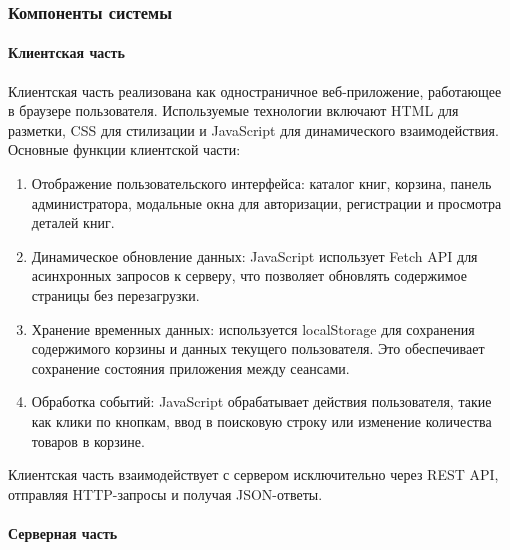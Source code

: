 \subsubsection{Компоненты системы}

\paragraph{Клиентская часть}

Клиентская часть реализована как одностраничное веб-приложение, работающее в браузере пользователя. Используемые технологии включают HTML для разметки, CSS для стилизации и JavaScript для динамического взаимодействия. Основные функции клиентской части:
	\begin{enumerate}
		\item Отображение пользовательского интерфейса: каталог книг, корзина, панель администратора, модальные окна для авторизации, регистрации и просмотра деталей книг.
		\item Динамическое обновление данных: JavaScript использует Fetch API для асинхронных запросов к серверу, что позволяет обновлять содержимое страницы без перезагрузки.
		\item Хранение временных данных: используется localStorage для сохранения содержимого корзины и данных текущего пользователя. Это обеспечивает сохранение состояния приложения между сеансами.
		\item Обработка событий: JavaScript обрабатывает действия пользователя, такие как клики по кнопкам, ввод в поисковую строку или изменение количества товаров в корзине.
	\end{enumerate}
	
	Клиентская часть взаимодействует с сервером исключительно через REST API, отправляя HTTP-запросы и получая JSON-ответы.

\paragraph{Серверная часть}

